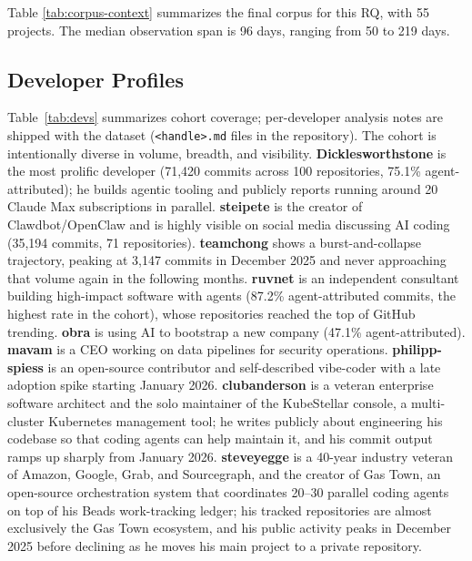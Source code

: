 \documentclass[smallextended]{svjour3}
\begin{document}
Table \ref{tab:corpus-context} summarizes the final corpus for this RQ, with 55 projects. The median observation span is 96 days, ranging from 50 to 219 days.

\subsection{Developer Profiles}
\label{sec:dataset-profiles}

Table~\ref{tab:devs} summarizes cohort coverage; per-developer analysis notes are shipped with the dataset (\texttt{<handle>.md} files in the repository).
The cohort is intentionally diverse in volume, breadth, and visibility.
\textbf{Dicklesworthstone} is the most prolific developer (71,420 commits across 100 repositories, 75.1\% agent-attributed); he builds agentic tooling and publicly reports running around 20 Claude Max subscriptions in parallel.
\textbf{steipete} is the creator of Clawdbot/OpenClaw and is highly visible on social media discussing AI coding (35,194 commits, 71 repositories).
\textbf{teamchong} shows a burst-and-collapse trajectory, peaking at 3,147 commits in December 2025 and never approaching that volume again in the following months.
\textbf{ruvnet} is an independent consultant building high-impact software with agents (87.2\% agent-attributed commits, the highest rate in the cohort), whose repositories reached the top of GitHub trending.
\textbf{obra} is using AI to bootstrap a new company (47.1\% agent-attributed).
\textbf{mavam} is a CEO working on data pipelines for security operations.
\textbf{philipp-spiess} is an open-source contributor and self-described vibe-coder with a late adoption spike starting January 2026.
\textbf{clubanderson} is a veteran enterprise software architect and the solo maintainer of the KubeStellar console, a multi-cluster Kubernetes management tool; he writes publicly about engineering his codebase so that coding agents can help maintain it, and his commit output ramps up sharply from January 2026.
\textbf{steveyegge} is a 40-year industry veteran of Amazon, Google, Grab, and Sourcegraph, and the creator of Gas Town, an open-source orchestration system that coordinates 20--30 parallel coding agents on top of his Beads work-tracking ledger; his tracked repositories are almost exclusively the Gas Town ecosystem, and his public activity peaks in December 2025 before declining as he moves his main project to a private repository.
\end{document}
